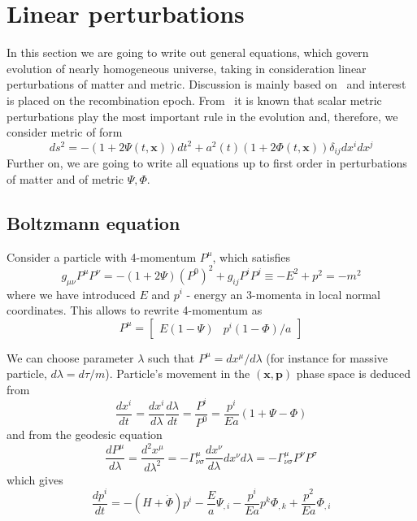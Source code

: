 \documentclass[12pt]{extarticle}
\numberwithin{problem}{section}
\numberwithin{theorem}{section}
\begin{document}
	\section{Linear perturbations}
	\label{sec:linear}
	In this section we are going to write out general equations, which govern evolution of nearly homogeneous universe, taking in consideration linear perturbations of matter and metric. Discussion is mainly based on~\cite{dodelson:2003} and interest is placed on the recombination epoch. From~\cite{gorbunov-rubakov-2:2011} it is known that scalar metric perturbations play the most important rule in the evolution and, therefore, we consider metric of form
	\begin{equation}
		\label{eq:perturb:metric}
		ds^2 = -(1 + 2\Psi(t, \mathbf{x}))dt^2 + a^2(t)(1 + 2\Phi(t, \mathbf{x}))\delta_{ij}dx^idx^j	
	\end{equation}
	Further on, we are going to write all equations up to first order in perturbations of matter and of metric $\Psi, \Phi$.
	
	\subsection{Boltzmann equation}
	Consider a particle with 4-momentum $P^\mu$, which satisfies 
	\begin{equation}
		g_{\mu\nu} P^\mu P^\nu = -(1 + 2\Psi)(P^0)^2 + g_{ij}P^iP^j \equiv -E^2 + p^2 = -m^2
	\end{equation}
	where we have introduced $E$ and $p^i$ - energy an 3-momenta in local normal coordinates. This allows to rewrite 4-momentum as 
	\begin{equation}
		\label{eq:4-momentum}
		P^\mu = \begin{bmatrix}
			E(1 - \Psi) & p^i(1 - \Phi) / a
		\end{bmatrix}
	\end{equation}
	
	We can choose parameter $\lambda$ such that $P^\mu = dx^\mu/d\lambda$ (for instance for massive particle, $d\lambda = d\tau/m$). Particle's movement in the $(\mathbf{x},\mathbf{p})$ phase space is deduced from
	\begin{equation}
		\label{eq:boltzmann:position}
		\frac{dx^i}{dt} = \frac{dx^i}{d\lambda}\frac{d\lambda}{dt} = \frac{P^i}{P^0} = \frac{p^i}{Ea}(1+\Psi-\Phi)
	\end{equation}
	and from the geodesic equation
	\begin{equation}
		\label{eq:boltzmann:momentum}
		\frac{dP^\mu}{d\lambda} = \frac{d^2x^\mu}{d\lambda^2} = -\Gamma^\mu_{\nu\sigma}\frac{dx^\nu}{d\lambda}{dx^\nu}{d\lambda} = -\Gamma^\mu_{\nu\sigma}P^\nu P^\sigma
	\end{equation}
	which gives
	\begin{equation}
		\frac{dp^i}{dt} = -(H + \dot{\Phi})p^i - \frac{E}{a}\Psi_{,i} - \frac{p^i}{Ea}p^k\Phi_{,k} + \frac{p^2}{Ea}\Phi_{,i}
	\end{equation}
\end{document}
